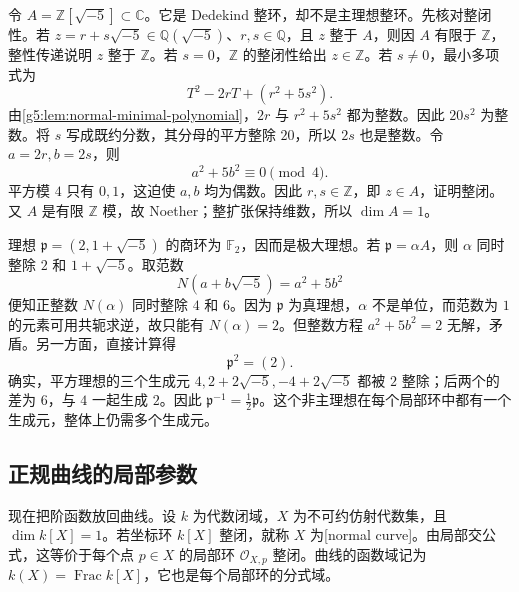 \begin{example}
\label{g5:exm:dedekind-nonprincipal}
	令 \(A=\mathbb Z[\sqrt{-5}]\subset\mathbb C\)。它是 Dedekind 整环，却不是主理想整环。先核对整闭性。若 \(z=r+s\sqrt{-5}\in\mathbb Q(\sqrt{-5})\)、\(r,s\in\mathbb Q\)，且 \(z\) 整于 \(A\)，则因 \(A\) 有限于 \(\mathbb Z\)，整性传递说明 \(z\) 整于 \(\mathbb Z\)。若 \(s=0\)，\(\mathbb Z\) 的整闭性给出 \(z\in\mathbb Z\)。若 \(s\ne0\)，最小多项式为
	\[
		T^2-2rT+(r^2+5s^2).
	\]
	由\cref{g5:lem:normal-minimal-polynomial}，\(2r\) 与 \(r^2+5s^2\) 都为整数。因此 \(20s^2\) 为整数。将 \(s\) 写成既约分数，其分母的平方整除 \(20\)，所以 \(2s\) 也是整数。令 \(a=2r,b=2s\)，则
	\[
		a^2+5b^2\equiv0\pmod4.
	\]
	平方模 \(4\) 只有 \(0,1\)，这迫使 \(a,b\) 均为偶数。因此 \(r,s\in\mathbb Z\)，即 \(z\in A\)，证明整闭。又 \(A\) 是有限 \(\mathbb Z\) 模，故 Noether；整扩张保持维数，所以 \(\dim A=1\)。

	理想 \(\mathfrak p=(2,1+\sqrt{-5})\) 的商环为 \(\mathbb F_2\)，因而是极大理想。若 \(\mathfrak p=\alpha A\)，则 \(\alpha\) 同时整除 \(2\) 和 \(1+\sqrt{-5}\)。取范数
	\[
		N(a+b\sqrt{-5})=a^2+5b^2
	\]
	便知正整数 \(N(\alpha)\) 同时整除 \(4\) 和 \(6\)。因为 \(\mathfrak p\) 为真理想，\(\alpha\) 不是单位，而范数为 \(1\) 的元素可用共轭求逆，故只能有 \(N(\alpha)=2\)。但整数方程 \(a^2+5b^2=2\) 无解，矛盾。另一方面，直接计算得
	\[
		\mathfrak p^2=(2).
	\]
	确实，平方理想的三个生成元 \(4,2+2\sqrt{-5},-4+2\sqrt{-5}\) 都被 \(2\) 整除；后两个的差为 \(6\)，与 \(4\) 一起生成 \(2\)。因此 \(\mathfrak p^{-1}=\tfrac12\mathfrak p\)。这个非主理想在每个局部环中都有一个生成元，整体上仍需多个生成元。
\end{example}

\subsection{正规曲线的局部参数}
\label{g5:subsec:0401:04}

现在把阶函数放回曲线。设 \(k\) 为代数闭域，\(X\) 为不可约仿射代数集，且 \(\dim k[X]=1\)。若坐标环 \(k[X]\) 整闭，就称 \(X\) 为[normal curve]。由局部交公式，这等价于每个点 \(p\in X\) 的局部环 \(\mathcal O_{X,p}\) 整闭。曲线的函数域记为 \(k(X)=\operatorname{Frac}k[X]\)，它也是每个局部环的分式域。

